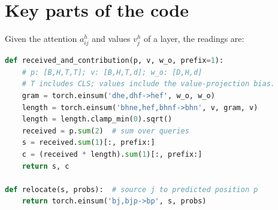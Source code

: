 \clearpage
\section{Key parts of the code}
\label{app:code}

Given the attention $a_{ij}^h$ and values $v_j^h$ of a layer, the readings are:

\begin{lstlisting}[language=Python]
def received_and_contribution(p, v, w_o, prefix=1):
    # p: [B,H,T,T]; v: [B,H,T,d]; w_o: [D,H,d]
    # T includes CLS; values include the value-projection bias.
    gram = torch.einsum('dhe,dhf->hef', w_o, w_o)
    length = torch.einsum('bhne,hef,bhnf->bhn', v, gram, v)
    length = length.clamp_min(0).sqrt()
    received = p.sum(2)  # sum over queries
    s = received.sum(1)[:, prefix:]
    c = (received * length).sum(1)[:, prefix:]
    return s, c

def relocate(s, probs):  # source j to predicted position p
    return torch.einsum('bj,bjp->bp', s, probs)
\end{lstlisting}
